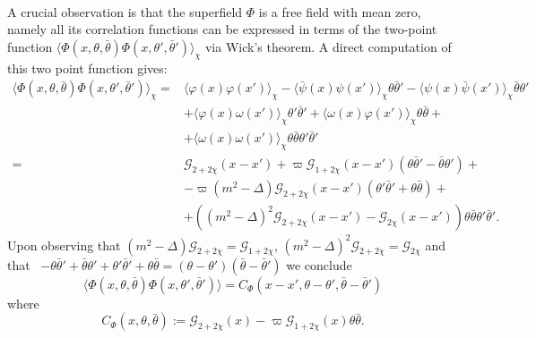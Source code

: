 \documentclass[a4paper,10pt]{article}
\newcommand{\assign}{:=}
\begin{document}
\

A crucial observation is that the superfield $\Phi$ is a free field with mean
zero, namely all its correlation functions can be expressed in terms of the
two-point function $\langle \Phi (x, \theta, \bar{\theta}) \Phi (x, \theta',
\bar{\theta}') \rangle_{\chi}$ via Wick's theorem. A direct computation of
this two point function gives:
\begin{align*}
  \langle \Phi (x, \theta, \bar{\theta}) \Phi (x, \theta', \bar{\theta}')
  \rangle_{\chi} = & \langle \varphi (x) \varphi (x') \rangle_{\chi} - \langle
  \bar{\psi} (x) \psi (x') \rangle_{\chi} \theta \bar{\theta}' - \langle \psi
  (x) \bar{\psi} (x') \rangle_{\chi} \bar{\theta} \theta'\\
  & + \langle \varphi (x) \omega (x') \rangle_{\chi} \theta' \bar{\theta}' +
  \langle \omega (x) \varphi (x') \rangle_{\chi} \theta \bar{\theta} +\\
  & + \langle \omega (x) \omega (x') \rangle_{\chi} \theta \bar{\theta}
  \theta' \bar{\theta}'\\
  = & \mathcal{G}_{2 + 2 \chi} (x - x') + \varpi \mathcal{G}_{1 + 2 \chi} (x -
  x') (\theta \bar{\theta}' - \bar{\theta} \theta') +\\
  & - \varpi (m^2 - \Delta) \mathcal{G}_{2 + 2 \chi} (x - x') (\theta'
  \bar{\theta}' + \theta \bar{\theta}) +\\
  & + ((m^2 - \Delta)^2 \mathcal{G}_{2 + 2 \chi} (x - x') -\mathcal{G}_{2
  \chi} (x - x')) \theta \bar{\theta} \theta' \bar{\theta}' .
\end{align*}
Upon observing that $(m^2 - \Delta) \mathcal{G}_{2 + 2 \chi} =\mathcal{G}_{1 +
2 \chi}$, $(m^2 - \Delta)^2 \mathcal{G}_{2 + 2 \chi} =\mathcal{G}_{2 \chi}$
and that \ $- \theta \bar{\theta}' + \bar{\theta} \theta' + \theta'
\bar{\theta}' + \theta \bar{\theta} = (\theta - \theta') (\bar{\theta} -
\bar{\theta}')$ we conclude
\begin{equation}
  \langle \Phi (x, \theta, \bar{\theta}) \Phi (x, \theta', \bar{\theta}')
  \rangle = C_{\Phi} (x - x', \theta - \theta', \bar{\theta} - \bar{\theta}')
  \label{eq:correlation}
\end{equation}
where
\[ C_{\Phi} (x, \theta, \bar{\theta}) \assign \mathcal{G}_{2 + 2 \chi} (x) -
   \varpi \mathcal{G}_{1 + 2 \chi} (x) \theta \bar{\theta} . \]
\end{document}
